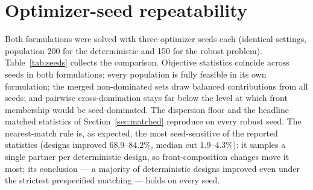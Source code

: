\section{Optimizer-seed repeatability}
\label{app:seeds}

Both formulations were solved with three optimizer seeds each (identical
settings, population 200 for the deterministic and 150 for the robust
problem). Table~\ref{tab:seeds} collects the comparison. Objective
statistics coincide across seeds in both formulations; every population is
fully feasible in its own formulation; the merged non-dominated sets draw
balanced contributions from all seeds; and pairwise cross-domination stays
far below the level at which front membership would be seed-dominated.
The dispersion floor and the headline matched statistics of
Section~\ref{sec:matched} reproduce on every robust seed. The
nearest-match rule is, as expected, the most seed-sensitive of the
reported statistics (designs improved 68.9--84.2\%, median cut
1.9--4.3\%): it samples a single partner per deterministic design, so
front-composition changes move it most; its conclusion --- a majority of
deterministic designs improved even under the strictest prespecified
matching --- holds on every seed.

